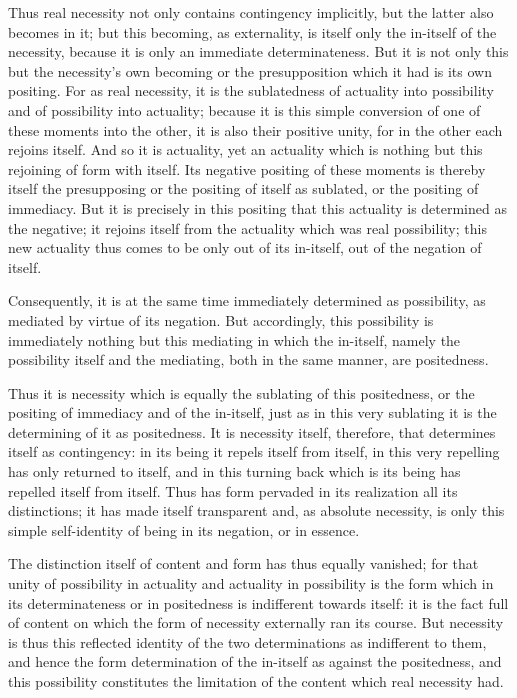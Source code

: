 Thus real necessity not only contains contingency implicitly,
but the latter also becomes in it;
but this becoming, as externality, is itself
only the in-itself of the necessity,
because it is only an immediate determinateness.
But it is not only this but the necessity's own becoming
or the presupposition which it had is its own positing.
For as real necessity, it is the sublatedness
of actuality into possibility
 and of possibility into actuality;
because it is this simple conversion of one of these moments into the other, it is also
their positive unity, for in the other each rejoins itself. And so it is actuality,
yet an actuality which is nothing but this rejoining of form with itself. Its
negative positing of these moments is thereby itself the presupposing or the
positing of itself as sublated, or the positing of immediacy.
But it is precisely in this positing that this actuality is determined as the
negative; it rejoins itself from the actuality which was real possibility; this
new actuality thus comes to be only out of its in-itself, out of the negation
of itself.

Consequently, it is at the same time immediately determined
as possibility, as mediated by virtue of its negation. But accordingly, this
possibility is immediately nothing but this mediating in which the in-itself,
namely the possibility itself and the mediating, both in the same manner,
are positedness.

Thus it is necessity which is equally the sublating of this
positedness, or the positing of immediacy and of the in-itself, just as in this
very sublating it is the determining of it as positedness. It is necessity itself,
therefore, that determines itself as contingency: in its being it repels itself
from itself, in this very repelling has only returned to itself, and in this
turning back which is its being has repelled itself from itself.
Thus has form pervaded in its realization all its distinctions; it has made
itself transparent and, as absolute necessity, is only this simple self-identity of
being in its negation, or in essence.

The distinction itself of content and
form has thus equally vanished;
for that unity of possibility in actuality
and actuality in possibility is
the form which in its determinateness
or in positedness is indifferent towards itself:
it is the fact full of content on
which the form of necessity externally ran its course.
But necessity is thus this reflected identity of
the two determinations as indifferent to them,
and hence the form determination of the in-itself
as against the positedness,
and this possibility constitutes the limitation of
the content which real necessity had.

